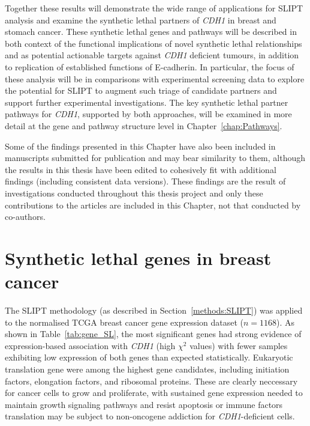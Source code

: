 Together these results will demonstrate the wide range of applications for SLIPT analysis and examine the synthetic lethal partners of \textit{CDH1} in breast and stomach cancer. These synthetic lethal genes and pathways will be described in both context of the functional implications of novel synthetic lethal relationships and as potential actionable targets against \textit{CDH1} deficient tumours, in addition to replication of established functions of E-cadherin. In particular, the focus of these analysis will be in comparisons with experimental screening data to explore the potential for SLIPT to augment such triage of candidate partners and support further experimental investigations. The key synthetic lethal partner pathways for \textit{CDH1}, supported by both approaches, will be examined in more detail at the gene and pathway structure level in Chapter~\ref{chap:Pathways}.

Some of the findings presented in this Chapter have also been included in manuscripts submitted for publication \citep{KellyHDGC, KellyBMC} and may bear similarity to them, although the results in this thesis have been edited to cohesively fit with additional findings (including consistent data versions). These findings are the result of investigations conducted throughout this thesis project and only these contributions to the articles are included in this Chapter, not that conducted by co-authors.

\section{Synthetic lethal genes in breast cancer} \label{chapt3:exprSL_genes}

The SLIPT methodology (as described in Section~\ref{methods:SLIPT}) was applied to the normalised TCGA breast cancer gene expression dataset ($n = 1168$). As shown in Table~\ref{tab:gene_SL}, the most significant genes had strong evidence of expression-based association with \textit{CDH1} (high $\chi^2$ values) with fewer samples exhibiting low expression of both genes than expected statistically. Eukaryotic translation gene were among the highest gene candidates, including initiation factors, elongation factors, and ribosomal proteins. These are clearly neccessary for cancer cells to grow and proliferate, with sustained gene expression needed to maintain growth signaling pathways and resist apoptosis or immune factors translation may be subject to non-oncogene addiction for \textit{CDH1}-deficient cells.


